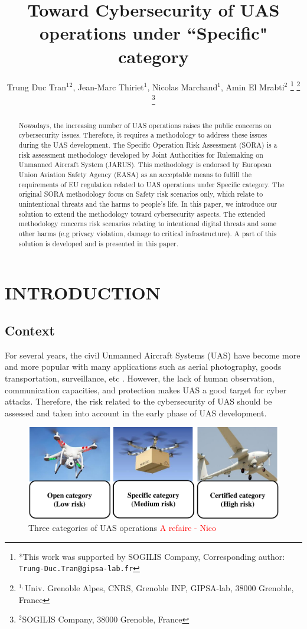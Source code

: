 \documentclass[a4paper, 10, conference]{ieeeconf}  %
\title{\LARGE \bf
Toward Cybersecurity of UAS operations under ``Specific" category
}
\author{Trung Duc Tran$^{1}$$^{2}$, Jean-Marc Thiriet$^{1}$, Nicolas Marchand$^{1}$, Amin El Mrabti$^{2}$%
	\thanks{*This work was supported by SOGILIS Company, Corresponding author: {\tt\small Trung-Duc.Tran@gipsa-lab.fr}}%
	\thanks{$^{1,}$Univ. Grenoble Alpes, CNRS, Grenoble INP, GIPSA-lab, 38000 Grenoble, France}%
	\thanks{$^{2}$SOGILIS Company, 38000 Grenoble, France}
}
\begin{document}



\maketitle


\begin{abstract}
 Nowadays, the increasing number of UAS operations raises the public concerns on cybersecurity issues. Therefore, it requires a methodology to address these issues during the UAS development. The Specific Operation Risk Assessment (SORA) is a risk assessment methodology developed by Joint Authorities for Rulemaking on Unmanned Aircraft System (JARUS). This methodology is endorsed by European Union Aviation Safety Agency (EASA) as an acceptable means to fulfill the requirements of EU regulation related to UAS operations under Specific category. The original SORA methodology focus on Safety risk scenarios only, which relate to unintentional threats and the harms to people's life. In this paper, we introduce our solution to extend the methodology toward cybersecurity aspects. The extended methodology concerns risk scenarios relating to intentional digital threats and some other harms (e.g privacy violation, damage to critical infrastructure). A part of this solution is developed and is presented in this paper.  
\end{abstract}


\section{INTRODUCTION}
\subsection{Context}
For several years, the civil Unmanned Aircraft Systems (UAS) have become more and more popular with many applications such as aerial photography, goods transportation, surveillance, etc \cite{vattapparamban_drones_2016}. However, the lack of human observation, communication capacities, and protection makes UAS a good target for cyber attacks. Therefore, the risk related to the cybersecurity of UAS should be assessed and taken into account in the early phase of UAS development.

\begin{figure}[!ht]
	\centering
	\includegraphics[width=3.3 in]{image/3categories.pdf}
	\caption{Three categories of UAS operations \textcolor{red}{A refaire - Nico}}
	\label{fig: riskscenario}
\end{figure}    
\end{document}
